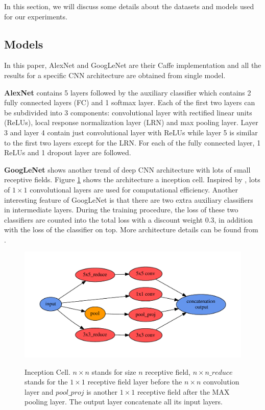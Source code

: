 ﻿In this section, we will discuss some details about the datasets and models used for our experiments.
\subsection{Models}
In this paper, AlexNet and GoogLeNet are their Caffe\cite{jia2014caffe} implementation and all the results for a specific CNN architecture are obtained from single model.

\textbf{AlexNet}
 contains 5 layers followed by the auxiliary classifier which contains 2 fully connected layers (FC) and 1 softmax layer. Each of the first two layers can be subdivided into 3 components: convolutional layer with rectified linear units (ReLUs), local response normalization layer (LRN) and max pooling layer. Layer 3 and layer 4 contain just convolutional layer with ReLUs while layer 5 is similar to the first two layers except for the LRN. For each of the fully connected layer, 1 ReLUs and 1 dropout\cite{srivastava2014dropout} layer are followed.

 \textbf{GoogLeNet}
  shows another trend of deep CNN architecture with lots of small receptive fields. Figure \ref{incept} shows the architecture a inception cell. Inspired by \cite{lin2013network}, lots of $1\times 1$ convolutional layers are used for computational efficiency. Another interesting feature of GoogLeNet is that there are two extra auxiliary classifiers in intermediate layers. During the training procedure, the loss of these two classifiers are counted into the total loss with a discount weight 0.3, in addition with the loss of the classifier on top. More architecture details can be found from \cite{szegedy2014going}.

\begin{figure}
  \centering
  \includegraphics[scale=.45]{fig/inception.pdf}\\
  \caption{Inception Cell. $n\times n$ stands for size $n$ receptive field, $n\times n\_reduce$ stands for the $1\times 1$ receptive field layer before the $n\times n$ convolution layer and $pool\_proj$ is another $1\times 1$ receptive field after the MAX pooling layer. The output layer concatenate all its input layers.}\label{incept}
\end{figure}


